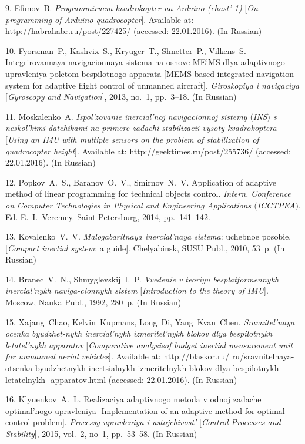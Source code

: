 {9. Efimov~B. \emph{Programmiruem kvadrokopter na Arduino (chast'
1)} [\emph{On programming of Arduino-quadrocopter}]. Available at:
http://habrahabr.ru/post/227425/ (accessed: 22.01.2016). (In
Russian)

10. Fyorsman~P., Kashvix~S., Kryuger~T., Shnetter~P., Vilkens~S.
Integrirovannaya navigacionnaya sistema na osnove ME'MS dlya
adaptivnogo upravleniya poletom bespilotnogo apparata [MEMS-based
integrated navigation system for adaptive flight control of
unmanned aircraft]. \emph{Giroskopiya i navigaciya}
[\emph{Gyroscopy and Navigation}], 2013, no.~1, pp.~3--18. (In
Russian)

11. Moskalenko~A. \emph{Ispol'zovanie inercial'noj navigacionnoj
sistemy $($INS$)$ s neskol'kimi datchikami na primere zadachi
stabilizacii vysoty kvadrokoptera} [\emph{Using an IMU with
multiple sensors on the problem of stabilization of quadrocopter
height}]. Available at:  http://geektimes.ru/post/255736/
(accessed: 22.01.2016). (In Russian)

12. Popkov~A.~S., Baranov~O.~V., Smirnov~N.~V. Application of
adaptive method of linear programming for technical objects
control. \emph{Intern. Conference on Computer Technologies in
Physical and Engineering Applications $($ICCTPEA$)$}. Ed.
E.~I.~Veremey. Saint Petersburg, 2014, pp.~141--142.

13. Kovalenko~V.~V. \emph{Malogabaritnaya inercial'naya sistema}:
uchebnoe posobie. [\emph{Compact inertial system}: a guide].
Chelyabinsk, SUSU Publ., 2010, 53~p. (In Russian)

14. Branec~V.~N., Shmyglevskij~I.~P. \emph{Vvedenie v teoriyu
besplatformennykh inercial'nykh naviga-\linebreak cionnykh sistem}
[\emph{Introduction to the theory of IMU}]. Moscow, Nauka Publ.,
1992, 280~p. (In Russian)

15. Xajang~Chao, Kelvin~Kupmans, Long~Di, Yang~Kvan~Chen.
\emph{Sravnitel'naya ocenka byudzhet-\linebreak nykh inercial'nykh
izmeritel'nykh blokov dlya bespilotnykh letatel'nykh apparatov}
[\emph{Comparative analysis\linebreak of budget inertial
measurement unit for unmanned aerial vehicles}]. Available at:
http://blaskor.ru/
ru/sravnitelnaya-otsenka-byudzhetnykh-inertsialnykh-izmeritelnykh-blokov-dlya-bespilotnykh-letatelnykh- 
apparatov.html (accessed: 22.01.2016). (In Russian)

16. Klyuenkov~A.~L. Realizaciya adaptivnogo metoda v odnoj zadache
optimal'nogo upravleniya [Implementation of an adaptive method for
optimal control problem].  \emph{Processy upravleniya i
ustojchivost'} [\emph{Control Processes and Stability}], 2015,
vol.~2, no~1, pp.~53--58. (In Russian)

}
